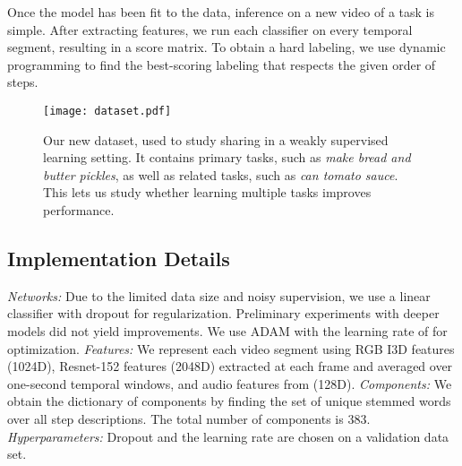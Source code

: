 \documentclass[10pt,twocolumn,letterpaper]{article}
\begin{document}
 Once the model has been fit to the data, inference on a new
video  of a task  is simple. After extracting features, we run each
classifier  on every temporal segment, resulting in a  score matrix.
To obtain a hard labeling, we use dynamic programming to find the
best-scoring labeling that respects the given order of steps.

\begin{figure*}[t]
\texttt{[image: dataset.pdf]}
\caption{Our new dataset, used to study sharing in a weakly supervised learning setting.
It contains primary tasks, such as {\it make bread and butter pickles}, as well as
related tasks, such as {\it can tomato sauce}. This lets us study whether learning
multiple tasks improves performance.}
\vspace{-0.1in}
\end{figure*}


\subsection{Implementation Details}

{\it Networks:} Due to the limited data size and noisy supervision, we use a linear classifier with dropout for regularization.
Preliminary experiments with deeper models did not yield improvements.
We use ADAM \cite{adam} with the learning rate of  for optimization.
{\it Features:} We represent each video segment  using RGB I3D features
\cite{carreira17quovadis} (1024D), Resnet-152 features \cite{he16resnet} (2048D) extracted at
each frame and averaged over one-second temporal windows, and audio features from
\cite{hershey17audio} (128D).
{\it Components:} We obtain the dictionary of components by finding the set of unique stemmed words over all step descriptions. The total number of components is 383.
{\it Hyperparameters:} Dropout and the learning rate are chosen on a validation data set.
\end{document}
